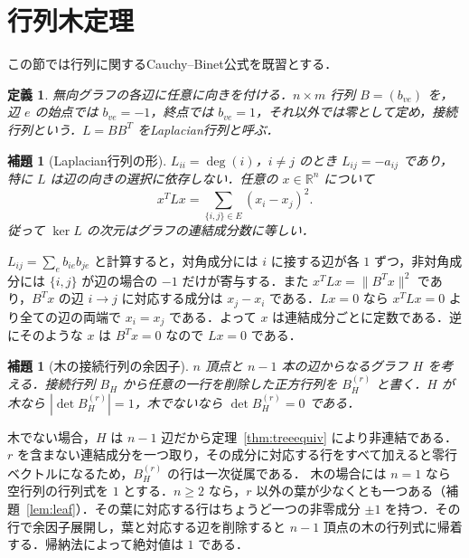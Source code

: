 \documentclass[a5paper,10pt,onecolumn]{jsarticle}
\makeatletter
\theoremstyle{mathnotetheorem}
\newtheorem{definition}[theorem]{定義}
\newtheorem{lemma}[theorem]{補題}
\renewcommand{\proofname}{証明}
\renewenvironment{proof}[1][\proofname]{%
  \par\pushQED{\qed}\normalfont\topsep4\p@\@plus2\p@\relax
  \trivlist\item[\hskip\labelsep\bfseries #1]\ignorespaces
}{\popQED\endtrivlist\@endpefalse}
\makeatother
\begin{document}
\section{行列木定理}
この節では行列に関するCauchy--Binet公式を既習とする．
\begin{definition}
無向グラフの各辺に任意に向きを付ける．$n\times m$ 行列 $B=(b_{ve})$ を，辺 $e$ の始点では $b_{ve}=-1$，終点では $b_{ve}=1$，それ以外では零として定め，\emph{接続行列}という．$L=BB^T$ を\emph{Laplacian行列}と呼ぶ．
\end{definition}
\begin{lemma}[Laplacian行列の形]\label{lem:laplacian}
$L_{ii}=\deg(i)$，$i\ne j$ のとき $L_{ij}=-a_{ij}$ であり，特に $L$ は辺の向きの選択に依存しない．任意の $x\in\mathbb R^n$ について
\[
 x^TLx=\sum_{\{i,j\}\in E}(x_i-x_j)^2.
\]
従って $\ker L$ の次元はグラフの連結成分数に等しい．
\end{lemma}
\begin{proof}
$L_{ij}=\sum_e b_{ie}b_{je}$ と計算すると，対角成分には $i$ に接する辺が各 $1$ ずつ，非対角成分には $\{i,j\}$ が辺の場合の $-1$ だけが寄与する．また $x^TLx=\|B^Tx\|^2$ であり，$B^Tx$ の辺 $i\to j$ に対応する成分は $x_j-x_i$ である．$Lx=0$ なら $x^TLx=0$ より全ての辺の両端で $x_i=x_j$ である．よって $x$ は連結成分ごとに定数である．逆にそのような $x$ は $B^Tx=0$ なので $Lx=0$ である．
\end{proof}

\begin{lemma}[木の接続行列の余因子]\label{lem:treeinc}
$n$ 頂点と $n-1$ 本の辺からなるグラフ $H$ を考える．接続行列 $B_H$ から任意の一行を削除した正方行列を $B_H^{(r)}$ と書く．$H$ が木なら $|\det B_H^{(r)}|=1$，木でないなら $\det B_H^{(r)}=0$ である．
\end{lemma}
\begin{proof}
木でない場合，$H$ は $n-1$ 辺だから定理~\ref{thm:treeequiv} により非連結である．$r$ を含まない連結成分を一つ取り，その成分に対応する行をすべて加えると零行ベクトルになるため，$B_H^{(r)}$ の行は一次従属である．
木の場合には $n=1$ なら空行列の行列式を $1$ とする．$n\ge2$ なら，$r$ 以外の葉が少なくとも一つある（補題~\ref{lem:leaf}）．その葉に対応する行はちょうど一つの非零成分 $\pm1$ を持つ．その行で余因子展開し，葉と対応する辺を削除すると $n-1$ 頂点の木の行列式に帰着する．帰納法によって絶対値は $1$ である．
\end{proof}
\end{document}
